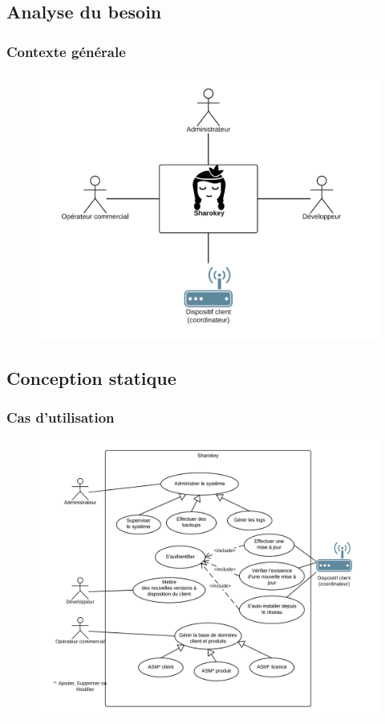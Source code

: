 \documentclass{beamer}
\begin{document}
\subsection{Analyse du besoin}
\begin{frame}
\frametitle{Contexte générale}
\begin{figure}
\centering
\includegraphics[scale=0.7]{images/context_general.png}
\end{figure}
\end{frame}
\subsection{Conception statique}
\begin{frame}
\frametitle{Cas d'utilisation}
\begin{figure}
\centering
\includegraphics[scale=0.45]{images/use_case_sharokey.png}
\end{figure}
\end{frame}
\end{document}
